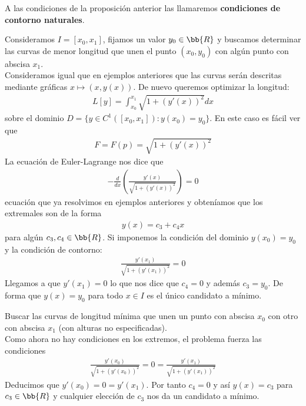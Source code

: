 \begin{definicion}
    A las condiciones de la proposición anterior las llamaremos \textbf{condiciones de contorno naturales}.
\end{definicion}

\begin{ejemplo}
    Consideramos $I=[x_0, x_1]$, fijamos un valor $y_0\in \bb{R}$ y buscamos determinar las curvas de menor longitud que unen el punto $(x_0, y_0)$ con algún punto con abscisa $x_1$.\\

    Consideramos igual que en ejemplos anteriores que las curvas serán descritas mediante gráficas $x\mapsto (x,y(x))$. De nuevo queremos optimizar la longitud:
    \begin{gather*}
        L[y] = \int_{x_0}^{x_1} \sqrt{1+(y'(x))^2} dx
    \end{gather*}
    sobre el dominio $D=\{y\in C^1([x_0, x_1]) : y(x_0)=y_0\}$. En este caso es fácil ver que 
    \begin{gather*}
        F=F(p)= \sqrt{1+(y'(x))^2}
    \end{gather*}
    La ecuación de Euler-Lagrange nos dice que
    \begin{gather*}
        -\frac{d}{dx} \left(\frac{y'(x)}{\sqrt{1+(y'(x))^2}}\right) = 0
    \end{gather*}
    ecuación que ya resolvimos en ejemplos anteriores y obteníamos que los extremales son de la forma 
    \begin{gather*}
        y(x) = c_3 + c_4x
    \end{gather*}
    para algún $c_3, c_4\in \bb{R}$. Si imponemos la condición del dominio $y(x_0)=y_0$ y la condición de contorno:
    \begin{gather*}
        \frac{y'(x_1)}{\sqrt{1+(y'(x_1))^2}} = 0
    \end{gather*}
    Llegamos a que $y'(x_1) = 0$ lo que nos dice que $c_4=0$ y además $c_3=y_0$. De forma que $y(x) = y_0$ para todo $x\in I$ es el único candidato a mínimo.
\end{ejemplo}

\begin{ejemplo}
    Buscar las curvas de longitud mínima que unen un punto con abscisa $x_0$ con otro con abscisa $x_1$ (con alturas no especificadas).\\

    Como ahora no hay condiciones en los extremos, el problema fuerza las condiciones
    \begin{gather*}
        \frac{y'(x_0)}{\sqrt{1+(y'(x_0))^2}} = 0 = \frac{y'(x_1)}{\sqrt{1+(y'(x_1))^2}}
    \end{gather*}
    Deducimos que $y'(x_0) = 0 = y'(x_1)$. Por tanto $c_4=0$ y así $y(x)=c_3$ para $c_3\in \bb{R}$ y cualquier elección de $c_3$ nos da un candidato a mínimo.
\end{ejemplo}

